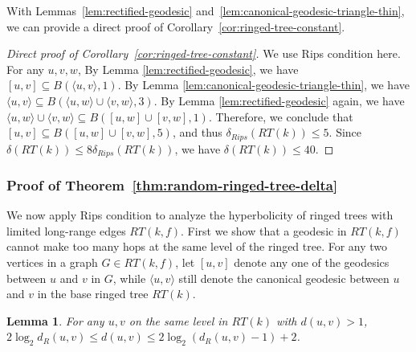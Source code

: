 \documentclass[11pt]{article}
\newtheorem{lem}{Lemma}
\begin{document}
With Lemmas~\ref{lem:rectified-geodesic} 
	and~\ref{lem:canonical-geodesic-triangle-thin}, we can provide
	a direct proof of Corollary~\ref{cor:ringed-tree-constant}.
\begin{proof}[Direct proof of Corollary~\ref{cor:ringed-tree-constant}]
We use Rips condition here. 
For any $u,v,w$, 
By Lemma \ref{lem:rectified-geodesic}, we have
	$[u,v] \subseteq B(\langle u,v \rangle,1)$.
By Lemma \ref{lem:canonical-geodesic-triangle-thin}, we have
	$\langle u,v \rangle \subseteq B(\langle u,w \rangle \cup 
	\langle v,w \rangle , 3)$.
By Lemma \ref{lem:rectified-geodesic} again, we have
	$\langle u,w \rangle \cup \langle v,w \rangle \subseteq 
	B([u,w] \cup [v,w],1)$. 
Therefore, we conclude that $[u,v] \subseteq B([u,w] \cup [v,w],5)$, 
	and thus $\delta_{Rips}(RT(k))\le 5$.
Since $\delta(RT(k)) \le 8\delta_{Rips}(RT(k))$, we have
	$\delta(RT(k))\le 40$.
\end{proof}





\subsubsection{Proof of Theorem~\ref{thm:random-ringed-tree-delta}}


We now apply Rips condition to analyze the hyperbolicity of ringed trees
	with limited long-range edges $RT(k,f)$.
First we show that a geodesic in $RT(k,f)$ 
	cannot make too many hops at the same level of the ringed tree.
For any two vertices in a graph $G \in RT(k,f)$, let $[u,v]$
	denote any one of the geodesics between $u$ and $v$ in $G$, while
	$\langle u, v \rangle$ still denote the canonical 
	geodesic between $u$ and $v$ in
	the base ringed tree $RT(k)$.


\begin{lem}\label{lem:dist-estm-by-ring-dist}
For any $u,v$ on the same level in $RT(k)$ with $d(u,v) > 1$, $2\log_2 d_R(u,v) \leq d(u,v) \leq 2\log_2 (d_R(u,v)-1) + 2$.
\end{lem}
\end{document}
